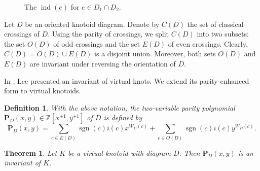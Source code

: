 \documentclass[12pt]{amsart}
\theoremstyle{noparens}
\newtheorem{theorem}{Theorem}[section]
\newtheorem{definition}{Definition}[section]
\numberwithin{equation}{section}
\numberwithin{equation}{section}
\begin{document}
\begin{figure}[htbp]
\begin{center}
		\caption{The $\operatorname{ind}(e)$ for $e \in D_1 \cap D_2$.} \label{fig511}
	\end{center}
\end{figure}

Let $D$ be an oriented knotoid diagram. Denote by $C(D)$ the set of classical crossings of $D$. Using the parity of crossings, we split $C(D)$ into two subsets: the set $O(D)$ of odd crossings and the set $E(D)$ of even crossings. Clearly, $C(D) = O(D) \cup E(D)$ is a disjoint union. Moreover, both sets $O(D)$ and $E(D)$ are invariant under reversing the orientation of $D$.

In \cite[Thm. 2.6]{Lee}, Lee presented an invariant of virtual knots. We extend its parity-enhanced form to virtual knotoids. 

\begin{definition} \label{def2.1}
	{\rm 
		With the above notation, \textit{the two-variable parity polynomial} $\mathbf{P}_D(x,y) \in \mathbb Z[x^{\pm 1}, y^{\pm 1}]$ of $D$ is defined by	
		$$
		\mathbf{P}_D(x,y)=\sum_{c \in E(D)} \operatorname{sgn}(c) i(c) x^{W_D(c)} + \sum_{c \in O(D)} \operatorname{sgn}(c) i(c) y^{W_D(c)}. 
		$$
	}
\end{definition}

\begin{theorem} \label{th2.1}
	Let $K$ be a virtual knotoid with diagram $D$. Then $\mathbf{P}_D(x,y)$ is an invariant of $K$.
\end{theorem}
\end{document}
